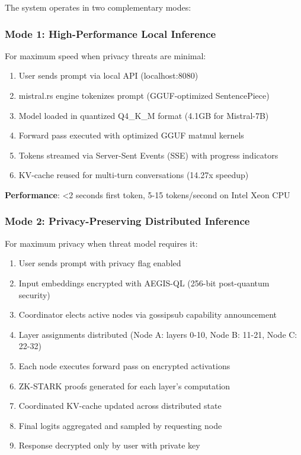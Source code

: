 \documentclass[11pt,a4paper]{article}
\begin{document}
The system operates in two complementary modes:

\subsubsection{Mode 1: High-Performance Local Inference}

For maximum speed when privacy threats are minimal:

\begin{enumerate}
    \item User sends prompt via local API (localhost:8080)
    \item mistral.rs engine tokenizes prompt (GGUF-optimized SentencePiece)
    \item Model loaded in quantized Q4\_K\_M format (4.1GB for Mistral-7B)
    \item Forward pass executed with optimized GGUF matmul kernels
    \item Tokens streamed via Server-Sent Events (SSE) with progress indicators
    \item KV-cache reused for multi-turn conversations (14.27x speedup)
\end{enumerate}

\textbf{Performance}: <2 seconds first token, 5-15 tokens/second on Intel Xeon CPU

\subsubsection{Mode 2: Privacy-Preserving Distributed Inference}

For maximum privacy when threat model requires it:

\begin{enumerate}
    \item User sends prompt with privacy flag enabled
    \item Input embeddings encrypted with AEGIS-QL (256-bit post-quantum security)
    \item Coordinator elects active nodes via gossipsub capability announcement
    \item Layer assignments distributed (Node A: layers 0-10, Node B: 11-21, Node C: 22-32)
    \item Each node executes forward pass on encrypted activations
    \item ZK-STARK proofs generated for each layer's computation
    \item Coordinated KV-cache updated across distributed state
    \item Final logits aggregated and sampled by requesting node
    \item Response decrypted only by user with private key
\end{enumerate}
\end{document}
